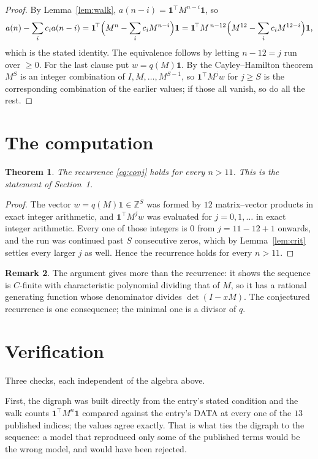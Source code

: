 \documentclass[11pt,a4paper]{article}
\theoremstyle{plain}
\newtheorem{theorem}{Theorem}
\theoremstyle{definition}
\newtheorem{remark}[theorem]{Remark}
\begin{document}
\begin{proof}
By Lemma~\ref{lem:walk}, $a(n-i)=\mathbf{1}^{\!\top}M^{n-i}\mathbf{1}$, so
\[
a(n)-\sum_i c_i a(n-i)
=\mathbf{1}^{\!\top}\Bigl(M^{n}-\sum_i c_i M^{n-i}\Bigr)\mathbf{1}
=\mathbf{1}^{\!\top}M^{\,n-12}\Bigl(M^{12}-\sum_i c_i M^{12-i}\Bigr)\mathbf{1},
\]
which is the stated identity. The equivalence follows by letting $n-12=j$ run over
$\ge0$. For the last clause put $w=q(M)\mathbf{1}$. By the Cayley--Hamilton theorem
$M^{S}$ is an integer combination of $I,M,\dots,M^{S-1}$, so
$\mathbf{1}^{\!\top}M^{j}w$ for $j\ge S$ is the corresponding combination of the
earlier values; if those all vanish, so do all the rest.
\end{proof}

\section{The computation}

\begin{theorem}
The recurrence \eqref{eq:conj} holds for every $n>11$. This is the statement of
Section~1.
\end{theorem}

\begin{proof}
The vector $w=q(M)\mathbf{1}\in\mathbb{Z}^{S}$ was formed by $12$ matrix--vector
products in exact integer arithmetic, and $\mathbf{1}^{\!\top}M^{j}w$ was evaluated for
$j=0,1,\dots$ in exact integer arithmetic. Every one of those integers is $0$ from
$j=11-12+1$ onwards, and the run was continued past $S$ consecutive zeros, which by
Lemma~\ref{lem:crit} settles every larger $j$ as well. Hence the recurrence holds for
every $n>11$.
\end{proof}

\begin{remark}
The argument gives more than the recurrence: it shows the sequence is $C$-finite with
characteristic polynomial dividing that of $M$, so it has a rational generating function
whose denominator divides $\det(I-xM)$. The conjectured recurrence is one consequence; the
minimal one is a divisor of $q$.
\end{remark}

\section{Verification}

Three checks, each independent of the algebra above.

First, the digraph was built directly from the entry's stated condition and the walk counts
$\mathbf{1}^{\!\top}M^{n}\mathbf{1}$ compared against the entry's DATA at every one of
the $13$ published indices; the values agree exactly. That is what ties the digraph to
the sequence: a model that reproduced only some of the published terms would be the wrong
model, and would have been rejected.
\end{document}
